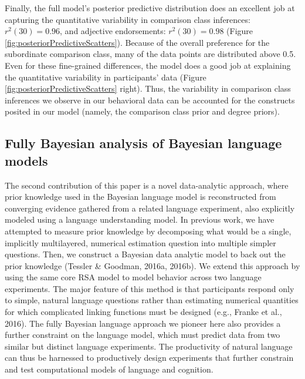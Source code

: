 \documentclass[doc]{apa6}
\begin{document}
Finally, the full model's posterior predictive distribution does an excellent job at capturing the quantitative variability in comparison class inferences: \(r^2(30) = 0.96\), and adjective endorsements: \(r^2(30) = 0.98\) (Figure \ref{fig:posteriorPredictiveScatters}). Because of the overall preference for the subordinate comparison class, many of the data points are distributed above 0.5. Even for these fine-grained differences, the model does a good job at explaining the quantitative variability in participants' data (Figure \ref{fig:posteriorPredictiveScatters} right). Thus, the variability in comparison class inferences we observe in our behavioral data can be accounted for the constructs posited in our model (namely, the comparison class prior and degree priors).

\subsection{Fully Bayesian analysis of Bayesian language
models}

The second contribution of this paper is a novel data-analytic approach,
where prior knowledge used in the Bayesian language model is
reconstructed from converging evidence gathered from a related language
experiment, also explicitly modeled using a language understanding
model. In previous work, we have attempted to measure prior knowledge by
decomposing what would be a single, implicitly multilayered, numerical
estimation question into multiple simpler questions. Then, we construct
a Bayesian data analytic model to back out the prior knowledge (Tessler
\& Goodman, 2016a, 2016b). We extend this approach by using the same
core RSA model to model behavior across two language experiments. The
major feature of this method is that participants respond only to
simple, natural language questions rather than estimating numerical
quantities for which complicated linking functions must be designed
(e.g., Franke et al., 2016). The fully Bayesian language approach we
pioneer here also provides a further constraint on the language model,
which must predict data from two similar but distinct language
experiments. The productivity of natural language can thus be harnessed
to productively design experiments that further constrain and test
computational models of language and cognition.


\newpage






\end{document}
